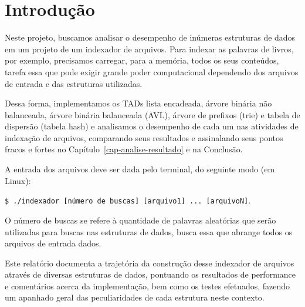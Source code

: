 \chapter*[Introdução]{Introdução}\label{cap-introducao} %

Neste projeto, buscamos analisar o desempenho de inúmeras estruturas de dados em um projeto de um indexador de arquivos. Para indexar as palavras de livros, por exemplo, precisamos carregar, para a memória, todos os seus conteúdos, tarefa essa que pode exigir grande poder computacional dependendo dos arquivos de entrada e das estruturas utilizadas. 

Dessa forma, implementamos os TADs lista encadeada, árvore binária não balanceada, árvore binária balanceada (AVL), árvore de prefixos (trie) e tabela de dispersão (tabela hash) e analisamos o desempenho de cada um nas atividades de indexação de arquivos, comparando seus resultados e assinalando seus pontos fracos e fortes no Capítulo~\ref{cap-analise-resultado} e na Conclusão.

A entrada dos arquivos deve ser dada pelo terminal, do seguinte modo (em Linux):

\texttt{\$ ./indexador [número de buscas] [arquivo1] ... [arquivoN]}.

\noindent O número de buscas se refere à quantidade de palavras aleatórias que serão utilizadas para buscas nas estruturas de dados, busca essa que abrange todos os arquivos de entrada dados.

Este relatório documenta a trajetória da construção desse indexador de arquivos através de diversas estruturas de dados, pontuando os resultados de performance e comentários acerca da implementação, bem como os testes efetuados, fazendo um apanhado geral das peculiaridades de cada estrutura neste contexto.